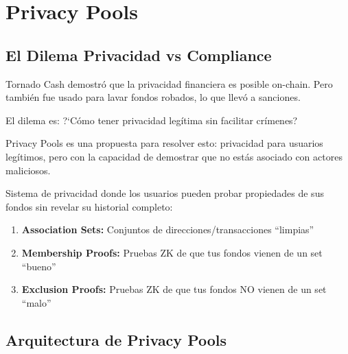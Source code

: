 \documentclass[11pt,a4paper,twoside]{book}
\begin{document}
\section{Privacy Pools}
\label{sec:privacypools}

\subsection{El Dilema Privacidad vs Compliance}

\begin{intuicion}
Tornado Cash demostr\'o que la privacidad financiera es posible on-chain. Pero tambi\'en fue usado para lavar fondos robados, lo que llev\'o a sanciones.

El dilema es: ?`C\'omo tener privacidad leg\'itima sin facilitar cr\'imenes?

Privacy Pools es una propuesta para resolver esto: privacidad para usuarios leg\'itimos, pero con la capacidad de demostrar que no est\'as asociado con actores maliciosos.
\end{intuicion}

\begin{definition}
Sistema de privacidad donde los usuarios pueden probar propiedades de sus fondos sin revelar su historial completo:
\begin{enumerate}
    \item \textbf{Association Sets:} Conjuntos de direcciones/transacciones ``limpias''
    \item \textbf{Membership Proofs:} Pruebas ZK de que tus fondos vienen de un set ``bueno''
    \item \textbf{Exclusion Proofs:} Pruebas ZK de que tus fondos NO vienen de un set ``malo''
\end{enumerate}
\end{definition}

\subsection{Arquitectura de Privacy Pools}
\end{document}
